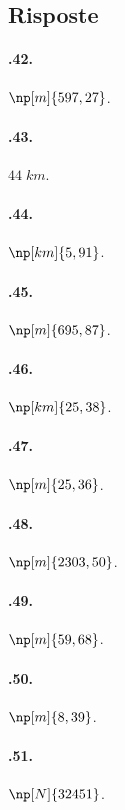 \subsection{Risposte}
\begin{multicols}{3}
 \paragraph{\thechapter.42.}$\np[m]{597,27}$.

\paragraph{\thechapter.43.}$44\;\unit{km}$.

\paragraph{\thechapter.44.}$\np[km]{5,91}$.

\paragraph{\thechapter.45.}$\np[m]{695,87}$.

\paragraph{\thechapter.46.}$\np[km]{25,38}$.

\paragraph{\thechapter.47.}$\np[m]{25,36}$.

\paragraph{\thechapter.48.}$\np[m]{2303,50}$.

\paragraph{\thechapter.49.}$\np[m]{59,68}$.

\paragraph{\thechapter.50.}$\np[m]{8,39}$.

\paragraph{\thechapter.51.}$\np[N]{32451}$.


\end{multicols}
